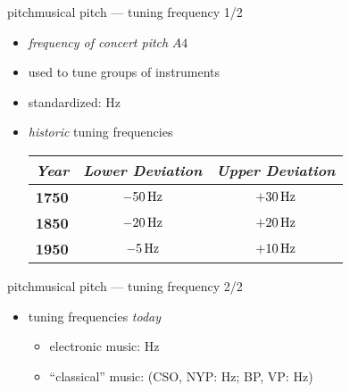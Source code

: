         \begin{frame}{pitch}{musical pitch --- tuning frequency 1/2}
            \begin{itemize}
                \item	\textit{frequency of concert pitch} $A4$
                \item	used to tune groups of instruments
                \item	standardized: \unit[440]{Hz}
            \end{itemize}
            \pause
            \vspace{3mm}
            \begin{itemize}
                \item	\textit{historic} tuning frequencies
                        \begin{footnotesize}\begin{table}
                            \vspace{-3mm}
                            \begin{tabular}{lcc} %
                                \\ \hline
                                \bf{\emph{Year}}	 & \bf{\emph{Lower Deviation}}	 & \bf{\emph{Upper Deviation}}\\ 
                                 \hline
                                \bf{1750}	 & $-\unit[50]{Hz}$	 & $+\unit[30]{Hz}$\\
                                \bf{1850}	 & $-\unit[20]{Hz}$	 & $+\unit[20]{Hz}$\\
                                \bf{1950}	 & $-\unit[5]{Hz}$	 & $+\unit[10]{Hz}$\\
                            \end{tabular}
                        \end{table}\end{footnotesize}
            \end{itemize}
        \end{frame}
        
        \begin{frame}{pitch}{musical pitch --- tuning frequency 2/2}
            \begin{itemize}
                \item	tuning frequencies \textit{today}
                        \begin{itemize}
                            \item	electronic music: \unit[440]{Hz}
                            \item	``classical'' music: (CSO, NYP: \unit[442]{Hz}; BP, VP: \unit[443]{Hz})
                        \end{itemize}
            \end{itemize}
        \end{frame}
        
